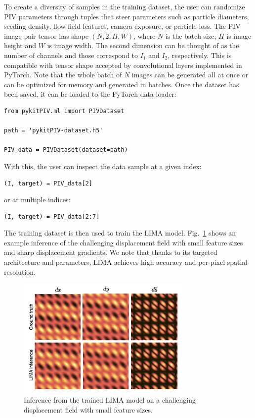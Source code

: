 \documentclass[a4paper,fleqn]{cas-dc}
\newcommand{ \kamila}[1]{\color{blue}{Kamila: #1} \color{black}}
\begin{document}
To create a diversity of samples in the training dataset, the user can randomize PIV parameters through tuples that steer parameters such as particle diameters, seeding density, flow field features, camera exposure, or particle loss. The PIV image pair tensor has shape $(N, 2, H, W)$, where $N$ is the batch size, $H$ is image height and $W$ is image width. The second dimension can be thought of as the number of channels and those correspond to $I_1$ and $I_2$, respectively. This is compatible with tensor shape accepted by convolutional layers implemented in PyTorch. Note that the whole batch of $N$ images can be generated all at once or can be optimized for memory and generated in batches. Once the dataset has been saved, it can be loaded to the PyTorch data loader:
\lstset{language=Python}
\begin{lstlisting}
from pykitPIV.ml import PIVDataset

path = 'pykitPIV-dataset.h5'

PIV_data = PIVDataset(dataset=path)
\end{lstlisting}
With this, the user can inspect the data sample at a given index:
\lstset{language=Python}
\begin{lstlisting}
(I, target) = PIV_data[2]
\end{lstlisting}
or at multiple indices:
\lstset{language=Python}
\begin{lstlisting}
(I, target) = PIV_data[2:7]
\end{lstlisting}
The training dataset is then used to train the LIMA model. Fig.~\ref{fig:LIMA} shows an example inference of the challenging displacement field with small feature sizes and sharp displacement gradients. We note that thanks to its targeted architecture and parameters, LIMA achieves high accuracy and per-pixel spatial resolution.

\begin{figure}[t]
\centering
\includegraphics[width=8.5cm]{LIMA-inference.pdf}
\caption{Inference from the trained LIMA model on a challenging displacement field with small feature sizes. \kamila{This is my old training case, I will update it with the latest LIMA version after running new training on CSCS...}}
\label{fig:LIMA}
\end{figure}
\end{document}

